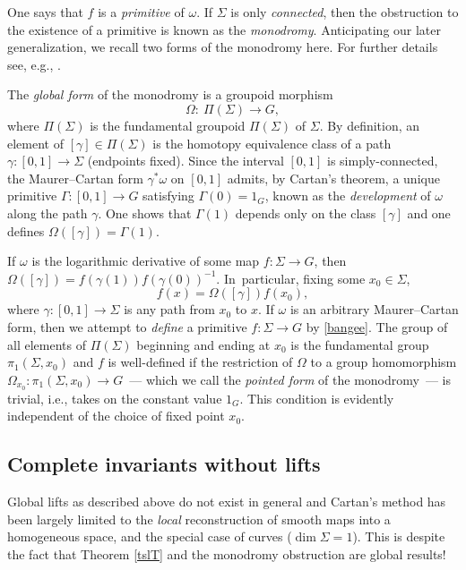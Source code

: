 \documentclass[pdftex]{sigma}%
\numberwithin{equation}{section}
\begin{document}
One says that $f$ is a {\it primitive} of $\omega $. If $\Sigma $ is
only {\itshape connected}, then the obstruction to the existence of a
primitive is known as the {\it monodromy}. Anticipating our later
generalization, we recall two forms of the monodromy here. For further
details see, e.g., \cite[Theorem~7.14, p.~124]{Sharpe_97}.

The {\it global form} of the monodromy is a groupoid morphism
\begin{equation}
 \Omega \colon\ \Pi(\Sigma) \rightarrow G,\label{otter}
\end{equation}
where $\Pi(\Sigma) $ is the fundamental groupoid $\Pi(\Sigma )$ of
$\Sigma $. By definition, an element of $[\gamma] \in \Pi(\Sigma )$ is
the homotopy equivalence class of a path
$\gamma \colon [0,1] \rightarrow \Sigma $ (endpoints fixed). Since the
interval $[0,1]$ is simply-connected, the Maurer--Cartan form
$\gamma^*\omega $ on $[0,1]$ admits, by Cartan's theorem, a unique
primitive $\Gamma \colon [0,1] \rightarrow G$ satisfying
$\Gamma (0)=1_G$, known as the {\it development} of $\omega $ along
the path $\gamma $. One shows that $\Gamma (1) $ depends only on the
class $[\gamma]$ and one defines $\Omega([\gamma])=\Gamma (1)$.

If $\omega $ is the logarithmic derivative of some map $f \colon
\Sigma \rightarrow G$, then
$\Omega([\gamma])=f(\gamma(1))f(\gamma(0))^{-1}$. In~particular,
fixing some $x_0 \in \Sigma $,
\begin{equation}
f(x)=\Omega([\gamma])f(x_0),
\label{bangee}
\end{equation}
where $\gamma \colon [0,1] \rightarrow \Sigma $ is any
path from $x_0$ to $x$. If $\omega $ is an arbitrary Maurer--Cartan
form, then we attempt to {\em define} a primitive $f \colon \Sigma
\rightarrow G$ by \eqref{bangee}. The group of all elements of
$\Pi(\Sigma)$ beginning and ending at $x_0$ is the fundamental group
$\pi_1(\Sigma , x_0)$ and $f$ is well-defined if the restriction of
$\Omega$ to a group homomorphism $\Omega_{x_0} \colon
\pi_1(\Sigma,x_0) \rightarrow G$~--- which we call the {\it pointed
form} of the monodromy~--- is trivial, i.e., takes on the constant
value $1_G$. This condition is evidently independent of the choice of
fixed point $x_0$.

\subsection*{Complete invariants without lifts}
Global lifts as
described above do not exist in general and Cartan's method has been
largely limited to the {\em local} reconstruction of smooth maps into
a homogeneous space, and the special case of curves ($\dim \Sigma =
1$). This is despite the fact that Theorem \ref{tslT} and the monodromy
obstruction are global results!
\end{document}
